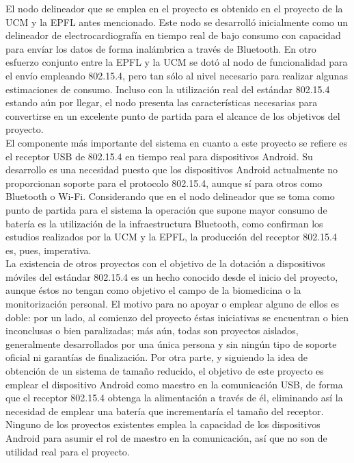 	El nodo delineador que se emplea en el proyecto es obtenido en el proyecto de la UCM y la EPFL antes mencionado. Este nodo se desarrolló inicialmente como un delineador de electrocardiografía en tiempo real de bajo consumo con capacidad para envíar los datos de forma inalámbrica a través de Bluetooth. En otro esfuerzo conjunto entre la EPFL y la UCM se dotó al nodo de funcionalidad para el envío empleando 802.15.4, pero tan sólo al nivel necesario para realizar algunas estimaciones de consumo. Incluso con la utilización real del estándar 802.15.4 estando aún por llegar, el nodo presenta las características necesarias para convertirse en un excelente punto de partida para el alcance de los objetivos del proyecto.\\

	El componente más importante del sistema en cuanto a este proyecto se refiere es el receptor USB de 802.15.4 en tiempo real para dispositivos Android. Su desarrollo es una necesidad puesto que los dispositivos Android actualmente no proporcionan soporte para el protocolo 802.15.4, aunque sí para otros como Bluetooth o Wi-Fi. Considerando que en el nodo delineador que se toma como punto de partida para el sistema la operación que supone mayor consumo de batería es la utilización de la infraestructura Bluetooth, como confirman los estudios realizados por la UCM y la EPFL, la producción del receptor 802.15.4 es, pues, imperativa.\\

	La existencia de otros proyectos con el objetivo de la dotación a dispositivos móviles del estándar 802.15.4 es un hecho conocido desde el inicio del proyecto, aunque éstos no tengan como objetivo el campo de la biomedicina o la monitorización personal. El motivo para no apoyar o emplear alguno de ellos es doble: por un lado, al comienzo del proyecto éstas iniciativas se encuentran o bien inconclusas o bien paralizadas; más aún, todas son proyectos aislados, generalmente desarrollados por una única persona y sin ningún tipo de soporte oficial ni garantías de finalización. Por otra parte, y siguiendo la idea de obtención de un sistema de tamaño reducido, el objetivo de este proyecto es emplear el dispositivo Android como maestro en la comunicación USB, de forma que el receptor 802.15.4 obtenga la alimentación a través de él, eliminando así la necesidad de emplear una batería que incrementaría el tamaño del receptor. Ninguno de los proyectos existentes emplea la capacidad de los dispositivos Android para asumir el rol de maestro en la comunicación, así que no son de utilidad real para el proyecto.\\

